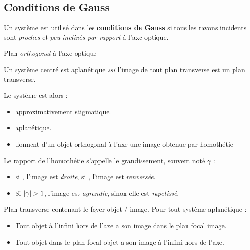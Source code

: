 \documentclass[11pt]{article}
\theoremstyle{cstyle}{\newtheorem{definition}{Définition}[section]}
\theoremstyle{cstyle}{\newtheorem{proposition}[definition]{Propriété}}
\theoremstyle{cstyle}{\newtheorem{theorem}[definition]{Théorème}}
\theoremstyle{mystyle}{\newtheorem{lemma}[definition]{Lemme}}
\theoremstyle{mystyle}{\newtheorem{corollary}[definition]{Corollaire}}
\theoremstyle{mystyle}{\newtheorem*{remark}{Remarque}}
\theoremstyle{mystyle}{\newtheorem*{remarks}{Remarques}}
\theoremstyle{mystyle}{\newtheorem*{example}{Exemple}}
\theoremstyle{mystyle}{\newtheorem*{examples}{Exemples}}
\theoremstyle{definition}{\newtheorem*{exercise}{Exercice}}
\theoremstyle{mystyle}{\newtheorem*{methode}{Méthode}}
\theoremstyle{cstyle}{\newtheorem*{cthm}{}}
\theoremstyle{warn}
\begin{document}
	\newpage
	
	\begin{minipage}[t]{0.46\textwidth}
		\subsection{Conditions de Gauss}
		
		\begin{definition}
			Un système est utilisé dans les \textbf{conditions de Gauss} si tous les rayons incidents sont \textit{proches} et \textit{peu inclinés par rapport} à l'axe optique.
		\end{definition}
	
		\begin{definition}
			Plan \textit{orthogonal} à l'axe optique
		\end{definition}
	
		\begin{definition}[Aplanétisme]
			Un système centré est aplanétique \textit{ssi} l'image de tout plan transverse est un plan transverse.
		\end{definition}
	
		\begin{proposition}
			Le système est alors :
			\begin{itemize}
				\item approximativement stigmatique.
				\item aplanétique.
				\item donnent d'un objet orthogonal à l'axe une image obtenue par homothétie.
			\end{itemize}
		\end{proposition}
	
		\begin{definition}[Grandissement]
			Le rapport de l'homothétie s'appelle le grandissement, souvent noté \(\gamma\) :
			\begin{itemize}
				\item si , l'image est \textit{droite}, si , l'image est \textit{renversée}.
				\item Si \(\abs{\gamma} > 1\), l'image est \textit{agrandie}, sinon elle est \textit{rapetissé}.
			\end{itemize}
		\end{definition}
	
		\begin{definition}
			Plan transverse contenant le foyer objet / image.
			Pour tout système aplanétique :
			\begin{itemize}
				\item Tout objet à l'infini hors de l'axe a son image dans le plan focal image.
				\item Tout objet dans le plan focal objet a son image à l'infini hors de l'axe.
			\end{itemize}
		\end{definition}
	\end{minipage}
\end{document}
